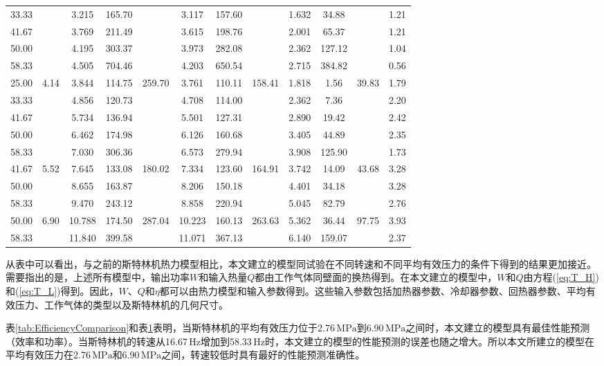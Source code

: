 \begin{table}
\begin{center}
\begin{tabular}{cccccccccccc}
		33.33	&&3.215	&165.70	&&3.117	&157.60	&&1.632	&34.88	&&1.21\\
		41.67	&&3.769	&211.49	&&3.615	&198.76	&&2.001	&65.37	&&1.21\\
		50.00	&&4.195	&303.37	&&3.973	&282.08	&&2.362	&127.12	&&1.04\\
		58.33	&&4.505	&704.46	&&4.203	&650.54	&&2.715	&384.82	&&0.56\\
		\midrule
		25.00	&\multirow{5}{*}{4.14}	&3.844	&114.75	&\multirow{5}{*}{259.70}	&3.761	&110.11	&\multirow{5}{*}{158.41}	&1.818	&1.56	&\multirow{5}{*}{39.83}	&1.79\\
		33.33	&&4.856	&120.73	&&4.708	&114.00	&&2.362	&7.36	&&2.20\\
		41.67	&&5.734	&136.94	&&5.501	&127.31	&&2.890	&19.42	&&2.42\\
		50.00	&&6.462	&174.98	&&6.126	&160.68	&&3.405	&44.89	&&2.35\\
		58.33	&&7.030	&306.36	&&6.573	&279.94	&&3.908	&125.90	&&1.73\\
		\midrule
		41.67	&\multirow{3}{*}{5.52}	&7.645	&133.08	&\multirow{3}{*}{180.02}	&7.334	&123.60	&\multirow{3}{*}{164.91}	&3.742	&14.09	&\multirow{3}{*}{43.68}	&3.28\\
		50.00	&&8.655	&163.87	&&8.206	&150.18	&&4.401	&34.18	&&3.28\\
		58.33	&&9.470	&243.12	&&8.858	&220.94	&&5.045	&82.79	&&2.76\\
		\midrule
		50.00	&\multirow{2}{*}{6.90}	&10.788	&174.50	&\multirow{2}{*}{287.04}	&10.223	&160.13	&\multirow{2}{*}{263.63}	&5.362	&36.44	&\multirow{2}{*}{97.75}		&3.93\\
		58.33	&&11.840	&399.58	&&11.071	&367.13	&&6.140	&159.07	&&2.37\\
		\bottomrule
	\end{tabular}
	\end{center}
	\label{tab:PowerComparison}
\end{table}

从表中可以看出，与之前的斯特林机热力模型相比，本文建立的模型同试验在不同转速和不同平均有效压力的条件下得到的结果更加接近。需要指出的是，上述所有模型中，输出功率$W$和输入热量$Q$都由工作气体同壁面的换热得到。在本文建立的模型中，$W$和$Q$由方程(\ref{eq:T_H})和(\ref{eq:T_L})得到。因此，$W$、$Q$和$\eta$都可以由热力模型和输入参数得到。这些输入参数包括加热器参数、冷却器参数、回热器参数、平均有效压力、工作气体的类型以及斯特林机的几何尺寸。

表\ref{tab:EfficiencyComparison}和表\ref{tab:PowerComparison}表明，当斯特林机的平均有效压力位于2.76$\,\mathrm{MPa}$到6.90$\,\mathrm{MPa}$之间时，本文建立的模型具有最佳性能预测（效率和功率）。当斯特林机的转速从16.67$\,\mathrm{Hz}$增加到58.33$\,\mathrm{Hz}$时，本文建立的模型的性能预测的误差也随之增大。所以本文所建立的模型在平均有效压力在2.76$\,\mathrm{MPa}$和6.90$\,\mathrm{MPa}$之间，转速较低时具有最好的性能预测准确性。

